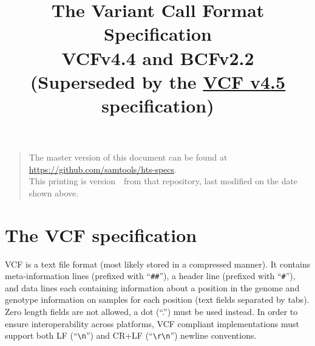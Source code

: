 \documentclass[8pt]{article}
\begin{document}

\title{The Variant Call Format Specification \\ \vspace{0.5em} \large VCFv4.4 and BCFv2.2
\normalsize\\[2ex]
(Superseded by the \href{http://samtools.github.io/hts-specs/VCFv4.5.pdf}{VCF v4.5} specification)}
\date{\headdate}
\maketitle
\begin{quote}\small
The master version of this document can be found at \url{https://github.com/samtools/hts-specs}.\\
This printing is version~\commitdesc\ from that repository, last modified on the date shown above.
\end{quote}
\vspace*{1em}

\newpage
\tableofcontents
\newpage

\section{The VCF specification}
VCF is a text file format (most likely stored in a compressed manner).
It contains meta-information lines (prefixed with ``\verb|##|''), a header line (prefixed with ``\verb|#|''), and data lines each containing information about a position in the genome and genotype information on samples for each position (text fields separated by tabs).
Zero length fields are not allowed, a dot (``.'') must be used instead.
In order to ensure interoperability across platforms, VCF compliant implementations must support both LF (``\verb|\n|'') and CR+LF (``\verb|\r\n|'') newline conventions.
\end{document}
